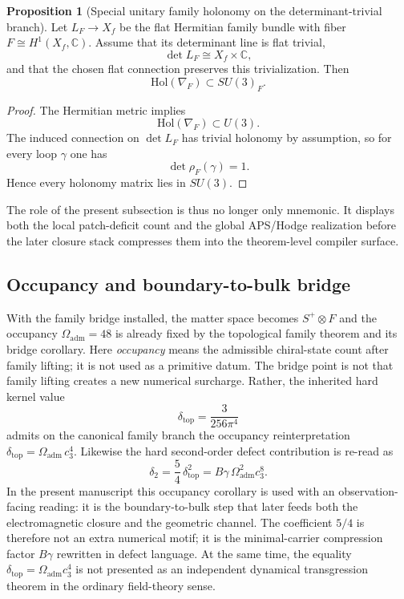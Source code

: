 \documentclass[11pt,a4paper]{article}
\theoremstyle{definition}
\newtheorem{proposition}[theorem]{Proposition}
\theoremstyle{remark}
\newcommand{\cthree}{c_3}
\newcommand{\deltatop}{\delta_{\mathrm{top}}}
\newcommand{\Oadm}{\Omega_{\mathrm{adm}}}
\begin{document}
\begin{proposition}[Special unitary family holonomy on the determinant-trivial branch]
\label{prop:family-holonomy-su3}
Let $L_F\to X_f$ be the flat Hermitian family bundle with fiber
$F\cong H^1(X_f,\mathbb C)$. Assume that its determinant line is flat trivial,
\[
\det L_F \cong X_f\times \mathbb C,
\]
and that the chosen flat connection preserves this trivialization. Then
\[
\mathrm{Hol}(\nabla_F)\subset SU(3)_F.
\]
\end{proposition}

\begin{proof}
The Hermitian metric implies
\[
\mathrm{Hol}(\nabla_F)\subset U(3).
\]
The induced connection on $\det L_F$ has trivial holonomy by assumption, so for
every loop $\gamma$ one has
\[
\det \rho_F(\gamma)=1.
\]
Hence every holonomy matrix lies in $SU(3)$.
\end{proof}

The role of the present subsection is thus no longer only mnemonic. It displays both the local patch-deficit count and the global APS/Hodge realization before the later closure stack compresses them into the theorem-level compiler surface.

\subsection{Occupancy and boundary-to-bulk bridge}

With the family bridge installed, the matter space becomes $S^+\otimes F$ and the occupancy $\Oadm=48$ is already fixed by the topological family theorem and its bridge corollary. Here \emph{occupancy} means the admissible chiral-state count after family lifting; it is not used as a primitive datum. The bridge point is not that family lifting creates a new numerical surcharge. Rather, the inherited hard kernel value
\[
\deltatop=\frac{3}{256\pi^4}
\]
admits on the canonical family branch the occupancy reinterpretation $\deltatop=\Oadm\,\cthree^4$.
Likewise the hard second-order defect contribution is re-read as
\[
\delta_2=\frac54\,\deltatop^2=B\gamma\,\Oadm^2\cthree^8.
\]
In the present manuscript this occupancy corollary is used with an observation-facing reading:
it is the boundary-to-bulk step that later feeds both the electromagnetic closure and the
geometric channel. The coefficient $5/4$ is therefore not an extra numerical motif; it is the
minimal-carrier compression factor $B\gamma$ rewritten in defect language. At the same time, the
equality $\deltatop=\Oadm\cthree^4$ is not presented as an independent dynamical transgression
theorem in the ordinary field-theory sense.
\end{document}
